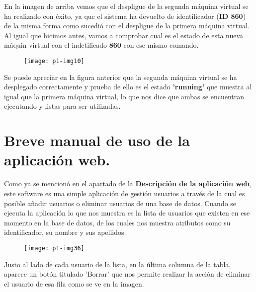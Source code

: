 \documentclass[10pt]{article}
\begin{document}
En la imagen de arriba vemos que el despligue de la segunda máquina virtual se ha realizado con éxito, ya que el sistema ha devuelto de identificador (\textbf{ID 860}) de la misma forma como sucedió con el despligue de la primera máquina virtual. Al igual que hicimos antes, vamos a comprobar cual es el estado de esta nueva máquin virtual con el indetificado \textbf{860} con ese mismo comando. \\

\begin{figure}[H]
	\begin{center}
 		\texttt{[image: p1-img10]}
	\end{center} 
\end{figure}


Se puede apreciar en la figura anterior que la segunda máquina virtual se ha desplegado correctamente y prueba de ello es el estado \textbf{'running'} que muestra al igual que la primera máquina virtual, lo que nos dice que ambas se encuentran ejecutando y listas para ser utilizadas.\\


\section{Breve manual de uso de la aplicación web.} 
Como ya se mencionó en el apartado de la \textbf{Descripción de la aplicación web}, este software es una simple aplicación de gestión usuarios a través de la cual es posible añadir usuarios o eliminar usuarios de una base de datos. Cuando se ejecuta la aplicación lo que nos muestra es la lista de usuarios que existen en ese momento en la base de datos, de los cuales nos muestra atributos como su identificador, su nombre y sus apellidos. \\

\begin{figure}[H]
	\begin{center}
 		\texttt{[image: p1-img36]}
	\end{center} 
\end{figure}

Justo al lado de cada usuario de la lista, en la última columna de la tabla, aparece un botón titulado 'Borrar' que nos permite realizar la acción de eliminar el usuario de esa fila como se ve en la imagen. \\
\end{document}
